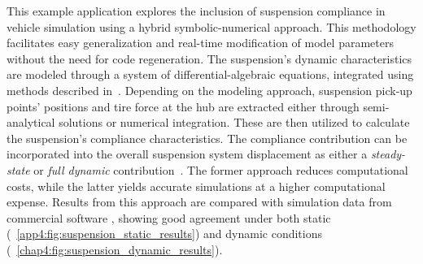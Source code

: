This example application explores the inclusion of suspension compliance in vehicle simulation using a hybrid symbolic-numerical approach. This methodology facilitates easy generalization and real-time modification of model parameters without the need for code regeneration. The suspension's dynamic characteristics are modeled through a system of differential-algebraic equations, integrated using methods described in~\cite{larcher2024symbolic}. Depending on the modeling approach, suspension pick-up points' positions and tire force at the hub are extracted either through semi-analytical solutions or numerical integration. These are then utilized to calculate the suspension's compliance characteristics. The compliance contribution can be incorporated into the overall suspension system displacement as either a \emph{steady-state} or \emph{full dynamic} contribution~\cite{larcher2024symbolic}. The former approach reduces computational costs, while the latter yields accurate simulations at a higher computational expense. Results from this approach are compared with simulation data from commercial software \Ansys{}, showing good agreement under both static (\figurename{}~\ref{app4:fig:suspension_static_results}) and dynamic conditions (\figurename{}~\ref{chap4:fig:suspension_dynamic_results}).




